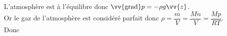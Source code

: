 ﻿\documentclass[a4paper]{article}
\begin{document}
\pagestyle{fancy}
\fancyhf{}
\setlength{\headheight}{15pt}

\begin{center}
	\large{}
\end{center}


L'atmosphère est à l'équilibre donc \(\vv{\mathrm{grad}}p=-\rho g\vv{z}\).\\
Or le gaz de l'atmosphère est considéré parfait donc \(\rho=\dfrac{m}{V}=\dfrac{Mn}{V}=\dfrac{Mp}{RT}\).\\
Donc 
\end{document}
